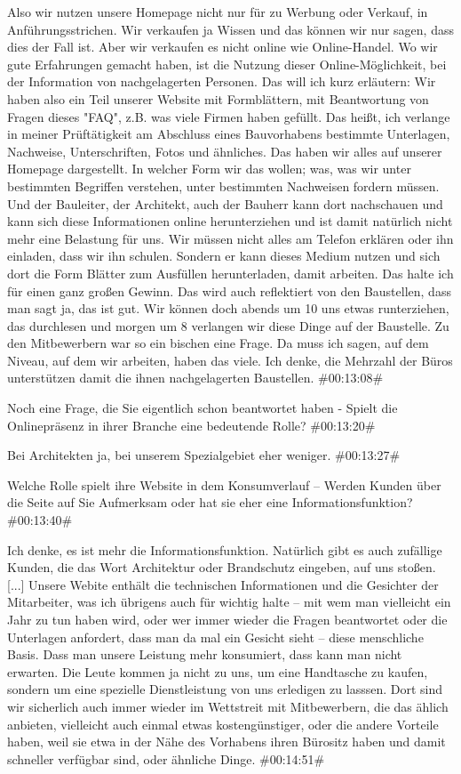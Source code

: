 \begin{description}
\Andre Also wir nutzen unsere Homepage nicht nur für zu Werbung oder Verkauf, in Anführungsstrichen. Wir verkaufen ja Wissen und das können wir nur sagen, dass dies der Fall ist. Aber wir verkaufen es nicht online wie Online-Handel. Wo wir gute Erfahrungen gemacht haben, ist die Nutzung dieser Online-Möglichkeit, bei der Information von nachgelagerten Personen. Das will ich kurz erläutern: Wir haben also ein Teil unserer Website mit Formblättern, mit Beantwortung von Fragen dieses "FAQ", z.B. was viele Firmen haben gefüllt. Das heißt, ich verlange in meiner Prüftätigkeit am Abschluss eines Bauvorhabens bestimmte Unterlagen, Nachweise, Unterschriften, Fotos und ähnliches. Das haben wir alles auf unserer Homepage dargestellt. In welcher Form wir das wollen; was, was wir unter bestimmten Begriffen verstehen, unter bestimmten Nachweisen fordern müssen. Und der Bauleiter, der Architekt, auch der Bauherr kann dort nachschauen und kann sich diese Informationen online herunterziehen und ist damit natürlich nicht mehr eine Belastung für uns. Wir müssen nicht alles am Telefon erklären oder ihn einladen, dass wir ihn schulen. Sondern er kann dieses Medium nutzen und sich dort die Form Blätter zum Ausfüllen herunterladen, damit arbeiten. Das halte ich für einen ganz großen Gewinn. Das wird auch reflektiert von den Baustellen, dass man sagt ja, das ist gut. Wir können doch abends um 10 uns etwas runterziehen, das durchlesen und morgen um 8 verlangen wir diese Dinge auf der Baustelle. Zu den Mitbewerbern war so ein bischen eine Frage. Da muss ich sagen, auf dem Niveau, auf dem wir arbeiten, haben das viele. Ich denke, die Mehrzahl der Büros unterstützen damit die ihnen nachgelagerten Baustellen. \#00:13:08\#

\Fabian Noch eine Frage, die Sie eigentlich schon beantwortet haben - Spielt die Onlinepräsenz in ihrer Branche eine bedeutende Rolle? \#00:13:20\# %

\Andre Bei Architekten ja, bei unserem Spezialgebiet eher weniger. \#00:13:27\#

\Fabian Welche Rolle spielt ihre Website in dem Konsumverlauf – Werden Kunden über die Seite auf Sie Aufmerksam oder hat sie eher eine Informationsfunktion? \#00:13:40\#

\Andre Ich denke, es ist mehr die Informationsfunktion. Natürlich gibt es auch zufällige Kunden, die das Wort Architektur oder Brandschutz eingeben, auf uns stoßen. [...] Unsere Webite enthält die technischen Informationen und die Gesichter der Mitarbeiter, was ich übrigens auch für wichtig halte – mit wem man vielleicht ein Jahr zu tun haben wird, oder wer immer wieder die Fragen beantwortet oder die Unterlagen anfordert, dass man da mal ein Gesicht sieht – diese menschliche Basis. Dass man unsere Leistung mehr konsumiert, dass kann man nicht erwarten. Die Leute kommen ja nicht zu uns, um eine Handtasche zu kaufen, sondern um eine spezielle Dienstleistung von uns erledigen zu lasssen. Dort sind wir sicherlich auch immer wieder im Wettstreit mit Mitbewerbern, die das ählich anbieten, vielleicht auch einmal etwas kostengünstiger, oder die andere Vorteile haben, weil sie etwa in der Nähe des Vorhabens ihren Bürositz haben und damit schneller verfügbar sind, oder ähnliche Dinge. \#00:14:51\#


\end{description}

